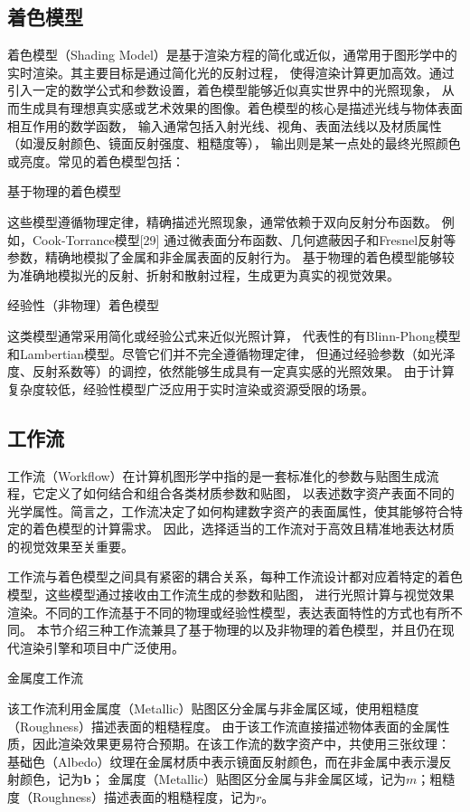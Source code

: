 \subsection{着色模型}

着色模型（Shading Model）是基于渲染方程的简化或近似，通常用于图形学中的实时渲染。其主要目标是通过简化光的反射过程，
使得渲染计算更加高效。通过引入一定的数学公式和参数设置，着色模型能够近似真实世界中的光照现象，
从而生成具有理想真实感或艺术效果的图像。着色模型的核心是描述光线与物体表面相互作用的数学函数，
输入通常包括入射光线、视角、表面法线以及材质属性（如漫反射颜色、镜面反射强度、粗糙度等），
输出则是某一点处的最终光照颜色或亮度。常见的着色模型包括：

基于物理的着色模型

这些模型遵循物理定律，精确描述光照现象，通常依赖于双向反射分布函数。
例如，Cook-Torrance模型[29] 通过微表面分布函数、几何遮蔽因子和Fresnel反射等参数，精确地模拟了金属和非金属表面的反射行为。
基于物理的着色模型能够较为准确地模拟光的反射、折射和散射过程，生成更为真实的视觉效果。

经验性（非物理）着色模型

这类模型通常采用简化或经验公式来近似光照计算，
代表性的有Blinn-Phong模型和Lambertian模型。尽管它们并不完全遵循物理定律，
但通过经验参数（如光泽度、反射系数等）的调控，依然能够生成具有一定真实感的光照效果。
由于计算复杂度较低，经验性模型广泛应用于实时渲染或资源受限的场景。

\subsection{工作流}
工作流（Workflow）在计算机图形学中指的是一套标准化的参数与贴图生成流程，它定义了如何结合和组合各类材质参数和贴图，
以表述数字资产表面不同的光学属性。简言之，工作流决定了如何构建数字资产的表面属性，使其能够符合特定的着色模型的计算需求。
因此，选择适当的工作流对于高效且精准地表达材质的视觉效果至关重要。

工作流与着色模型之间具有紧密的耦合关系，每种工作流设计都对应着特定的着色模型，这些模型通过接收由工作流生成的参数和贴图，
进行光照计算与视觉效果渲染。不同的工作流基于不同的物理或经验性模型，表达表面特性的方式也有所不同。
本节介绍三种工作流兼具了基于物理的以及非物理的着色模型，并且仍在现代渲染引擎和项目中广泛使用。

金属度工作流

该工作流利用金属度（Metallic）贴图区分金属与非金属区域，使用粗糙度（Roughness）描述表面的粗糙程度。
由于该工作流直接描述物体表面的金属性质，因此渲染效果更易符合预期。在该工作流的数字资产中，共使用三张纹理：
基础色（Albedo）纹理在金属材质中表示镜面反射颜色，而在非金属中表示漫反射颜色，记为$\mathbf{b}$；
金属度（Metallic）贴图区分金属与非金属区域，记为$m$；粗糙度（Roughness）描述表面的粗糙程度，记为$r$。

